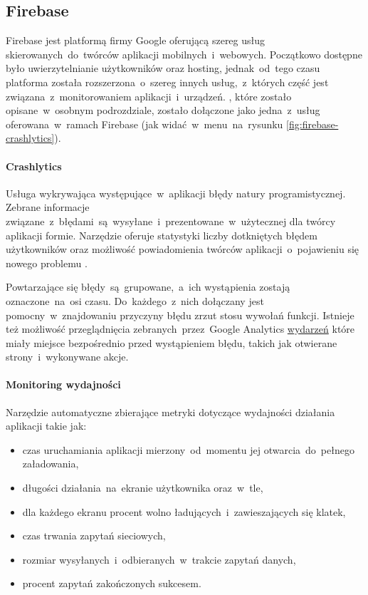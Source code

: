 \subsection{Firebase}
\label{sec:firebase}
Firebase jest platformą firmy Google oferującą szereg usług skierowanych~do~twórców aplikacji mobilnych~i~webowych. Początkowo dostępne było uwierzytelnianie użytkowników oraz hosting, jednak~od~tego czasu platforma została rozszerzona~o~szereg innych usług,~z~których część jest związana~z~monitorowaniem aplikacji~i~urządzeń. , które zostało opisane~w~osobnym podrozdziale, zostało dołączone jako jedna~z~usług oferowana~w~ramach Firebase (jak widać~w~menu~na~rysunku \ref{fig:firebase-crashlytics}).

\bigskip
{}

\paragraph{Crashlytics}
Usługa wykrywająca występujące~w~aplikacji błędy natury programistycznej. Zebrane informacje związane~z~błędami~są~wysyłane~i~prezentowane~w~użytecznej dla twórcy aplikacji formie. Narzędzie oferuje statystyki liczby dotkniętych błędem użytkowników oraz możliwość powiadomienia twórców aplikacji~o~pojawieniu się nowego problemu \cite{Fb_Crashlytics}.

Powtarzające się błędy~są~grupowane,~a~ich wystąpienia zostają oznaczone~na~osi czasu. Do~każdego~z~nich dołączany jest pomocny~w~znajdowaniu przyczyny błędu zrzut stosu wywołań funkcji. Istnieje też możliwość przeglądnięcia zebranych~przez~Google Analytics \hyperref[par:ga-events]{wydarzeń} które miały miejsce bezpośrednio przed wystąpieniem błędu, takich jak otwierane strony~i~wykonywane akcje. 

\paragraph{Monitoring wydajności}
Narzędzie automatyczne zbierające metryki dotyczące wydajności działania aplikacji takie jak:
\begin{itemize}
	\item czas uruchamiania aplikacji mierzony~od~momentu jej otwarcia~do~pełnego załadowania,
	\item długości działania~na~ekranie użytkownika oraz~w~tle,
	\item dla każdego ekranu procent wolno ładujących~i~zawieszających się klatek,
	\item czas trwania zapytań sieciowych,
	\item rozmiar wysyłanych~i~odbieranych~w~trakcie zapytań danych,
	\item procent zapytań zakończonych sukcesem.
\end{itemize}
\bigskip

